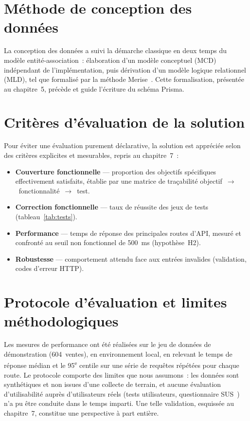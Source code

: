 \documentclass[11pt,a4paper]{report}
\begin{document}
\section{Méthode de conception des données}
La conception des données a suivi la démarche classique en deux temps du modèle
entité-association~: élaboration d'un modèle conceptuel (MCD) indépendant de
l'implémentation, puis dérivation d'un modèle logique relationnel (MLD), tel
que formalisé par la méthode Merise~\cite{tabourier1986merise}. Cette
formalisation, présentée au chapitre~5, précède et guide l'écriture du schéma
Prisma.

\section{Critères d'évaluation de la solution}
\label{sec:criteres}
Pour éviter une évaluation purement déclarative, la solution est appréciée selon
des critères explicites et mesurables, repris au chapitre~7~:
\begin{itemize}
  \item \textbf{Couverture fonctionnelle} — proportion des objectifs
        spécifiques effectivement satisfaits, établie par une matrice de
        traçabilité objectif~$\rightarrow$~fonctionnalité~$\rightarrow$~test.
  \item \textbf{Correction fonctionnelle} — taux de réussite des jeux de tests
        (tableau~\ref{tab:tests}).
  \item \textbf{Performance} — temps de réponse des principales routes d'API,
        mesuré et confronté au seuil non fonctionnel de 500~ms (hypothèse~H2).
  \item \textbf{Robustesse} — comportement attendu face aux entrées invalides
        (validation, codes d'erreur HTTP).
\end{itemize}

\section{Protocole d'évaluation et limites méthodologiques}
Les mesures de performance ont été réalisées sur le jeu de données de
démonstration (604~ventes), en environnement local, en relevant le temps de
réponse médian et le 95\textsuperscript{e} centile sur une série de requêtes
répétées pour chaque route. Le protocole comporte des limites que nous
assumons~: les données sont synthétiques et non issues d'une collecte de terrain,
et aucune évaluation d'utilisabilité auprès d'utilisateurs réels (tests
utilisateurs, questionnaire SUS~\cite{brooke1996sus}) n'a pu être conduite dans
le temps imparti. Une telle validation, esquissée au chapitre~7, constitue une
perspective à part entière.
\end{document}
